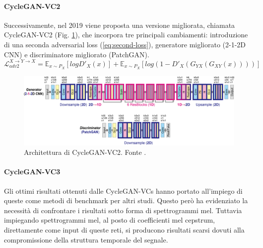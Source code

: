 			\paragraph{CycleGAN-VC2}
			Successivamente, nel 2019 viene proposta una versione migliorata, chiamata CycleGAN-VC2 (Fig. \ref{fig:cyclegan-vc2}), che incorpora tre principali cambiamenti: introduzione di una seconda adversarial loss (\ref{eq:second-loss}), generatore migliorato (2-1-2D CNN) e discriminatore migliorato (PatchGAN)\cite{CycleGAN-VC2}. 
			\begin{equation}
				\mathcal{L}_{adv2}^{X \rightarrow Y \rightarrow X} = \mathbb{E}_{x \sim P_X}[log D'_X(x)] + \mathbb{E}_{x \sim P_X}[log(1-D'_X(G_{YX}(G_{XY}(x))))]
				\label{eq:second-loss}
			\end{equation}
			
			\begin{figure}[h]
				\centering
				\includegraphics[width=1\linewidth]{figures/CycleGAN-VC2}
				\caption{Architettura di CycleGAN-VC2. Fonte \cite{CycleGAN-VC2}.}
				\label{fig:cyclegan-vc2}
			\end{figure}
			
			\paragraph{CycleGAN-VC3}
			Gli ottimi risultati ottenuti dalle CycleGAN-VCs hanno portato all'impiego di queste come metodi di benchmark per altri studi. Questo però ha evidenziato la necessità di confrontare i risultati sotto forma di spettrogrammi mel. Tuttavia impiegando spettrogrammi mel, al posto di coefficienti mel cepstrum, direttamente come input di queste reti, si producono risultati scarsi dovuti alla compromissione della struttura temporale del segnale.
			
